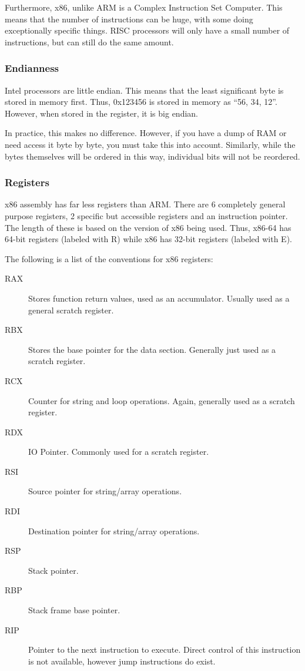 			Furthermore, x86, unlike ARM is a Complex Instruction Set Computer. 
			This means that the number of instructions can be huge, with some doing exceptionally specific things. 
			RISC processors will only have a small number of instructions, but can still do the same amount. 

			\subsubsection{Endianness}
				Intel processors are little endian. 
				This means that the least significant byte is stored in memory first. 
				Thus, 0x123456 is stored in memory as ``56, 34, 12''. 
				However, when stored in the register, it is big endian. 

				In practice, this makes no difference. 
				However, if you have a dump of RAM or need access it byte by byte, you must take this into account. 
				Similarly, while the bytes themselves will be ordered in this way, individual bits will not be reordered. 

			\subsubsection{Registers}
				x86 assembly has far less registers than ARM. 
				There are 6 completely general purpose registers, 2 specific but accessible registers and an instruction pointer. 
				The length of these is based on the version of x86 being used. 
				Thus, x86-64 has 64-bit registers (labeled with R) while x86 has 32-bit registers (labeled with E). 

				The following is a list of the conventions for x86 registers:
				\begin{description}
					\item[RAX] Stores function return values, used as an accumulator. Usually used as a general scratch register. 
					\item[RBX] Stores the base pointer for the data section. Generally just used as a scratch register. 
					\item[RCX] Counter for string and loop operations. Again, generally used as a scratch register. 
					\item[RDX] IO Pointer. Commonly used for a scratch register. 
					\item[RSI] Source pointer for string/array operations. 
					\item[RDI] Destination pointer for string/array operations. 
					\item[RSP] Stack pointer. 
					\item[RBP] Stack frame base pointer. 
					\item[RIP] Pointer to the next instruction to execute. 
						Direct control of this instruction is not available, however jump instructions do exist. 
				\end{description}

